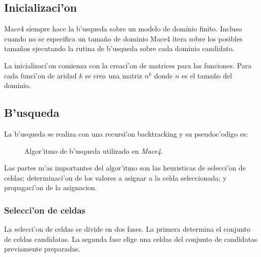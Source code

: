 \subsection{Inicializaci'on}

Mace4 siempre hace la b'usqueda sobre un modelo de dominio finito. Incluso cuando no se especifica un tamaño de dominio Mace4 itera sobre los posibles tamaños ejecutando la rutina de b'usqueda sobre cada dominio candidato.

La inicializaci'on comienza con la creaci'on de matrices para las funciones. Para cada funci'on de aridad $k$ se crea una matriz $n^k$ donde $n$ es el tamaño del dominio.

\subsection{B'usqueda}

La b'usqueda se realiza con una recursi'on backtracking y su pseudoc'odigo es:

\begin{figure}[htbp]
\caption{Algor'itmo de b'usqueda utilizado en \textit{Mace4}.}
\label{fig:mace4_busqueda}
\end{figure}

Las partes m'as importantes del algor'itmo son las heuristicas de selecci'on de celdas; determinaci'on de los valores a asignar a la celda seleccionada; y propagaci'on de la asignacion.

\subsubsection{Selecci'on de celdas}

La selecci'on de celdas se divide en dos fases. La primera determina el conjunto de celdas candidatas. La segunda fase elige una celdas del conjunto de candidatas previamente preparadas.

